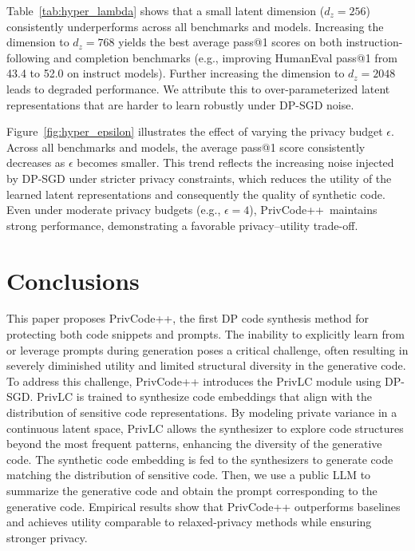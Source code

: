 \documentclass{article}
\theoremstyle{plain}
\theoremstyle{definition}
\theoremstyle{remark}
\def \toolname{PrivCode++}
\begin{document}
{Table~\ref{tab:hyper_lambda} shows that 
a small latent dimension ($d_z=256$) consistently underperforms across all benchmarks and models. 
Increasing the dimension to $d_z=768$ yields the best average pass@1 scores on both instruction-following and completion benchmarks (e.g., improving HumanEval pass@1 from 43.4 to 52.0 on instruct models). Further increasing the dimension to $d_z=2048$ leads to degraded performance. We attribute this to over-parameterized latent representations that are harder to learn robustly under DP-SGD noise. 


Figure~\ref{fig:hyper_epsilon} illustrates the effect of varying the privacy budget $\epsilon$. Across all benchmarks and models, the average pass@1 score consistently decreases as $\epsilon$ becomes smaller. This trend reflects the increasing noise injected by DP-SGD under stricter privacy constraints, which reduces the utility of the learned latent representations and consequently the quality of synthetic code. Even under moderate privacy budgets (e.g., $\epsilon=4$), \toolname \ maintains strong performance, demonstrating a favorable privacy–utility trade-off.






\section{Conclusions}

This paper proposes PrivCode++, the first DP code synthesis method for protecting both code snippets and prompts. 
The inability to explicitly learn from or leverage prompts during generation poses a critical challenge, often resulting in severely diminished utility and limited structural diversity in the generative code. To address this challenge, PrivCode++ introduces the PrivLC module using DP-SGD. PrivLC is trained to synthesize code embeddings that align with the distribution of sensitive code representations. By modeling private variance in a continuous latent space, PrivLC allows the synthesizer to explore code structures beyond the most frequent patterns, enhancing the diversity of the generative code. The synthetic code embedding is fed to the synthesizers to generate code matching the distribution of sensitive code. Then, we use a public LLM to summarize the generative code and obtain the prompt corresponding to the generative code. Empirical results show that PrivCode++ outperforms baselines and achieves utility comparable to relaxed-privacy methods while ensuring stronger privacy.


}
\end{document}
